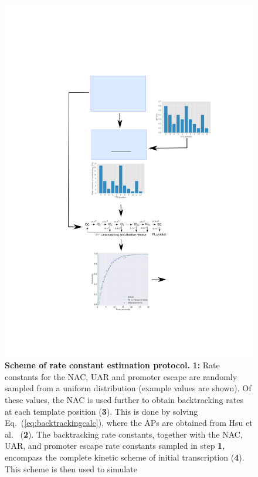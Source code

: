 \begin{figure}[h]
    \begin{center}
      \includegraphics{../illustrations/parameter_estimation_scheme}
    \end{center}
  \caption{ {\bf Scheme of rate constant estimation protocol.} \textbf{1:}
    Rate constants for the NAC, UAR and promoter escape are randomly sampled
    from a uniform distribution (example values are shown). Of these values,
    the NAC is used further to obtain backtracking rates at each template
    position (\textbf{3}). This is done by solving
    Eq.~(\ref{eq:backtrackingcalc}), where the APs are obtained from Hsu et
    al.\ \cite{hsu_initial_2006} (\textbf{2}). The backtracking rate
    constants, together with the NAC, UAR, and promoter escape rate constants
    sampled in step \textbf{1}, encompass the complete kinetic scheme of
    initial transcription (\textbf{4}). This scheme is then used to simulate
}
\end{figure}
